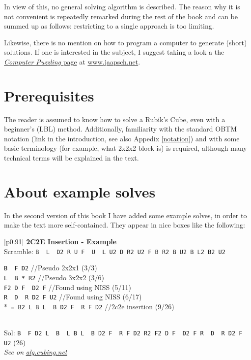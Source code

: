 \documentclass[11pt,a4paper]{book}
\newcommand{\p}{\textquotesingle}
\newcommand{\m}{\texttt}
\newcommand{\ps}{\p\,\,}
\newcommand{\comment}[1]{{\color{gray}\quad//#1}}
\begin{document}
In view of this, no general solving algorithm is described. The reason why it is not convenient is repeatedly remarked during the rest of the book and can be summed up as follows: restricting to a single approach is too limiting.

Likewise, there is no mention on how to program a computer to generate (short) solutions. If one is interested in the subject, I suggest taking a look a the \href{https://www.jaapsch.net/puzzles/compcube.htm}{\emph{Computer Puzzling} page} at \url{www.jaapsch.net}.

\section*{Prerequisites}

The reader is assumed to know how to solve a Rubik's Cube, even with a beginner's (LBL) method. Additionally, familiarity with the standard OBTM notation (link in the introduction, see also Appedix \ref{notation}) and with some basic terminology (for example, what 2x2x2 block is) is required, although many technical terms will be explained in the text.

\section*{About example solves}

In the second version of this book I have added some example solves, in order to make the text more self-contained. They appear in nice boxes like the following:

\bigskip
\begin{tabular}{|p{}|}
\hline
\textbf{2C2E Insertion - Example}\\
\hline
Scramble: \m{B\ps L\ps D2 R U F\ps U\ps L U2 D R2 U2 F B R2 B U2 B L2 B2 U2}\\
\hline
\begin{minipage}[l]{0.650\textwidth}
\m{B\ps F D2} \comment{Pseudo 2x2x1 (3/3)}\\
\m{L\ps B * R2} \comment{Pseudo 3x2x2 (3/6)}\\
\m{F2 D F\ps D2 F} \comment{Found using NISS (5/11)}\\
\m{R\ps D\ps R D2 F U2} \comment{Found using NISS (6/17)}\\
*\m{ = B2 L B L\ps B D2 F\ps R F D2} \comment{2c2e insertion (9/26)}
\end{minipage}
\begin{minipage}[c]{0.25\textwidth}

\end{minipage}\\
\hline
Sol: \m{B\ps F D2 L\ps B\ps L B L\ps B D2 F\ps R F D2 R2 F2 D F\ps D2 F R\ps D\ps R D2 F U2} (26)\\
\hline
\emph{See on }\href{https://alg.cubing.net/?setup=B-_L-_D2_R_U_F-_U-_L_U2_D_R2_U2_F_B_R2_B_U2_B_L2_B2_U2&alg=B-_F_D2_\%2F\%2FPseudo_2x2x1_(3\%2F3)\%0AL-_B_(B2_L_B_L-_B_D2_F-_R_F_D2)_R2_\%2F\%2FPseudo_3x2x2_(3\%2F6)\%0AF2_D_F-_D2_F_\%2F\%2FFound_using_NISS_(5\%2F11)\%0AR-_D-_R_D2_F_U2_\%2F\%2FFound_using_NISS_(6\%2F17)}{\emph{alg.cubing.net}}\\
\hline
\end{tabular}
\bigskip
\end{document}
